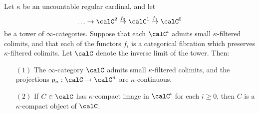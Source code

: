 \begin{lemma}\label{hardstuff3}
Let $\kappa$ be an uncountable regular cardinal, and let
$$ \ldots \rightarrow \calC^2 \stackrel{f_2}{\rightarrow} \calC^1 \stackrel{f_1}{\rightarrow} \calC^0$$ be a tower of $\infty$-categories. Suppose that each $\calC^i$ admits small $\kappa$-filtered colimits, and that each of the functors $f_i$ is a categorical fibration which preserves $\kappa$-filtered colimits.
Let $\calC$ denote the inverse limit of the tower. Then:
\begin{itemize}
\item[$(1)$] The $\infty$-category $\calC$ admits small $\kappa$-filtered colimits, and the projections
$p_n: \calC \rightarrow \calC^n$ are $\kappa$-continuous.

\item[$(2)$] If $C \in \calC$ has $\kappa$-compact image in $\calC^i$ for each $i \geq 0$, then
$C$ is a $\kappa$-compact object of $\calC$.
\end{itemize}
\end{lemma}

